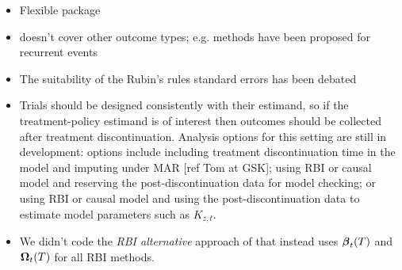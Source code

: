 \begin{itemize}
\item Flexible package
\item doesn't cover other outcome types; e.g. methods have been proposed for recurrent events \citep{Keene++14}
\item The suitability of the Rubin's rules standard errors has been debated \citep{ian:Carpenter_letter,Carpenter++14,Cro++19}
\item Trials should be designed consistently with their estimand, so if the treatment-policy estimand is of interest then outcomes should be collected after treatment discontinuation. Analysis options for this setting are still in development: options include including treatment discontinuation time in the model and imputing under MAR [ref Tom at GSK]; using RBI or causal model and reserving the post-discontinuation data for model checking; or using RBI or causal model and using the post-discontinuation data to estimate model parameters such as $K_{z,t}$. 
\item We didn't code the \emph{RBI alternative} approach of \citet{ian:RBIcausal} that instead uses $\boldsymbol{\beta}_t(T)$ and $\boldsymbol{\Omega}_t(T)$ for all RBI methods.

\end{itemize}

%
%


\address{Ian R White\\
MRC Clinical Trials Unit at UCL\\
90 High Holborn, 2nd Floor, London WC1V 6LJ\\
UK\\
ORCiD: 0000-0002-6718-7661\\
  }

\address{Kevin McGrath\\
MRC Clinical Trials Unit at UCL\\
90 High Holborn, 2nd Floor, London WC1V 6LJ\\
UK\\
  (ORCiD if desired)\\
  }

\address{Matteo Quartagno\\
MRC Clinical Trials Unit at UCL\\
90 High Holborn, 2nd Floor, London WC1V 6LJ\\
UK\\
  (ORCiD if desired)\\
  }

